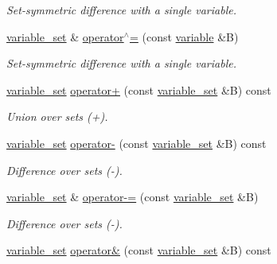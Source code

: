 \begin{DoxyCompactItemize}
\begin{DoxyCompactList}\small\item\em Set-\/symmetric difference with a single variable. \end{DoxyCompactList}\item 
\hyperlink{classmerlin_1_1variable__set}{variable\+\_\+set} \& \hyperlink{classmerlin_1_1variable__set_a19f5514dc23cb08df616cc6c69d17bb6}{operator$^\wedge$=} (const \hyperlink{classmerlin_1_1variable}{variable} \&B)\hypertarget{classmerlin_1_1variable__set_a19f5514dc23cb08df616cc6c69d17bb6}{}\label{classmerlin_1_1variable__set_a19f5514dc23cb08df616cc6c69d17bb6}

\begin{DoxyCompactList}\small\item\em Set-\/symmetric difference with a single variable. \end{DoxyCompactList}\item 
\hyperlink{classmerlin_1_1variable__set}{variable\+\_\+set} \hyperlink{classmerlin_1_1variable__set_a7209d8b38f3d0bc6316a2176d13a3a67}{operator+} (const \hyperlink{classmerlin_1_1variable__set}{variable\+\_\+set} \&B) const 
\begin{DoxyCompactList}\small\item\em Union over sets (+). \end{DoxyCompactList}\item 
\hyperlink{classmerlin_1_1variable__set}{variable\+\_\+set} \hyperlink{classmerlin_1_1variable__set_adf98eb40282f9c84c04188bb78471a86}{operator-\/} (const \hyperlink{classmerlin_1_1variable__set}{variable\+\_\+set} \&B) const 
\begin{DoxyCompactList}\small\item\em Difference over sets (-\/). \end{DoxyCompactList}\item 
\hyperlink{classmerlin_1_1variable__set}{variable\+\_\+set} \& \hyperlink{classmerlin_1_1variable__set_ab58724a10896f29669575024636a4914}{operator-\/=} (const \hyperlink{classmerlin_1_1variable__set}{variable\+\_\+set} \&B)
\begin{DoxyCompactList}\small\item\em Difference over sets (-\/). \end{DoxyCompactList}\item 
\hyperlink{classmerlin_1_1variable__set}{variable\+\_\+set} \hyperlink{classmerlin_1_1variable__set_a6712399404c2a13376f65b60e1d86466}{operator\&} (const \hyperlink{classmerlin_1_1variable__set}{variable\+\_\+set} \&B) const 

\end{DoxyCompactItemize}
